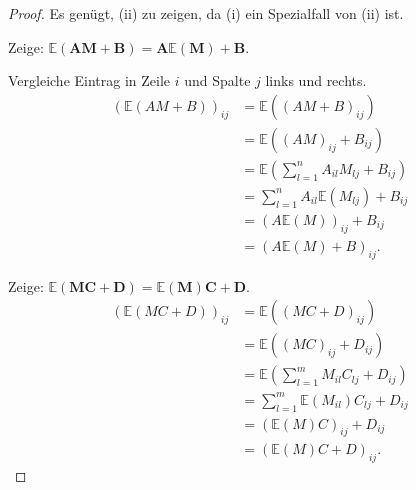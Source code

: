 \documentclass{tstextbook}
\begin{document}
\begin{proof}
	

Es genügt, (ii) zu zeigen, da (i) ein Spezialfall von (ii) ist. 

Zeige: $\mathbb{E}(\textbf{A}\textbf{M}+\textbf{B})=\textbf{A}\mathbb{E}(\textbf{M})+\textbf{B}.$

Vergleiche Eintrag in Zeile $i$ und Spalte $j$ links und rechts.
\begin{align*}
	\left(\mathbb{E}(AM+B)\right)_{ij} & =\mathbb{E}\left((AM+B)_{ij}\right)\\
	& =\mathbb{E}\left((AM)_{ij}+B{}_{ij}\right)\\
	& =\mathbb{E}\left(\sum_{l=1}^{n}A_{il}M{}_{lj}+B{}_{ij}\right)\\
	& =\sum_{l=1}^{n}A_{il}\mathbb{E}\left(M_{lj}\right)+B_{ij}\\
	& =\left(A\mathbb{E}(M)\right)_{ij}+B_{ij}\\
	& =\left(A\mathbb{E}(M)+B\right)_{ij}.
\end{align*}

Zeige: $\mathbb{E}(\textbf{M}\textbf{C}+\textbf{D})=\mathbb{E}(\textbf{M})\textbf{C}+\textbf{D}$.
\begin{align*}
	\left(\mathbb{E}(MC+D)\right)_{ij} & =\mathbb{E}\left((MC+D)_{ij}\right)\\
	& =\mathbb{E}\left((MC)_{ij}+D{}_{ij}\right)\\
	& =\mathbb{E}\left(\sum_{l=1}^{m}M_{il}C{}_{lj}+D{}_{ij}\right)\\
	& =\sum_{l=1}^{m}\mathbb{E}\left(M_{il}\right)C_{lj}+D_{ij}\\
	& =\left(\mathbb{E}(M)C\right)_{ij}+D_{ij}\\
	& =\left(\mathbb{E}(M)C+D\right)_{ij}.
\end{align*}

\end{proof}
\end{document}
